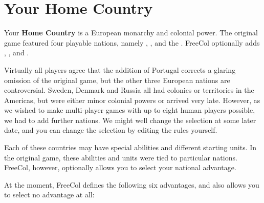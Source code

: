 \documentclass[12pt]{book}
\begin{document}
\hypertarget{Home Country}{\chapter{Your Home Country}}

Your \textbf{Home Country} is a European monarchy and colonial
power. The original game featured four playable nations, namely
, ,  and the
. FreeCol optionally adds
, ,  and
.

Virtually all players agree that the addition of Portugal corrects a
glaring omission of the original game, but the other three European
nations are controversial. Sweden, Denmark and Russia all had colonies
or territories in the Americas, but were either minor colonial powers
or arrived very late. However, as we wished to make multi-player games
with up to eight human players possible, we had to add further
nations. We might well change the selection at some later date, and
you can change the selection by editing the rules yourself.

Each of these countries may have special abilities and different
starting units. In the original game, these abilities and units were
tied to particular nations. FreeCol, however, optionally allows you to
select your national advantage.

At the moment, FreeCol defines the following six advantages, and also
allows you to select no advantage at all:
\end{document}
